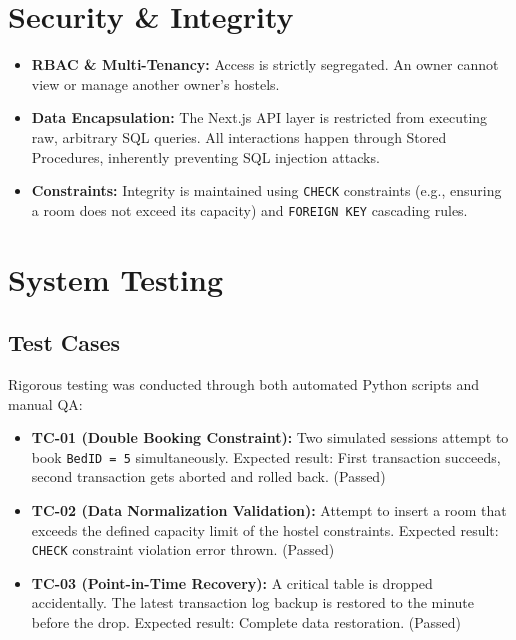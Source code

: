 \documentclass[12pt, a4paper]{report}
\begin{document}
\chapter{Security \& Integrity}
\begin{itemize}
    \item \textbf{RBAC \& Multi-Tenancy:} Access is strictly segregated. An owner cannot view or manage another owner's hostels.
    \item \textbf{Data Encapsulation:} The Next.js API layer is restricted from executing raw, arbitrary SQL queries. All interactions happen through Stored Procedures, inherently preventing SQL injection attacks.
    \item \textbf{Constraints:} Integrity is maintained using \texttt{CHECK} constraints (e.g., ensuring a room does not exceed its capacity) and \texttt{FOREIGN KEY} cascading rules.
\end{itemize}

\chapter{System Testing}
\section{Test Cases}
Rigorous testing was conducted through both automated Python scripts and manual QA:
\begin{itemize}
    \item \textbf{TC-01 (Double Booking Constraint):} Two simulated sessions attempt to book \texttt{BedID = 5} simultaneously. Expected result: First transaction succeeds, second transaction gets aborted and rolled back. (Passed)
    \item \textbf{TC-02 (Data Normalization Validation):} Attempt to insert a room that exceeds the defined capacity limit of the hostel constraints. Expected result: \texttt{CHECK} constraint violation error thrown. (Passed)
    \item \textbf{TC-03 (Point-in-Time Recovery):} A critical table is dropped accidentally. The latest transaction log backup is restored to the minute before the drop. Expected result: Complete data restoration. (Passed)
\end{itemize}
\end{document}
